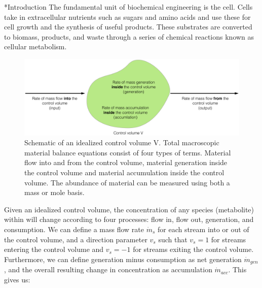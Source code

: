 \documentclass[12pt]{article}
\makeatletter
\renewcommand\section{\@startsection
	{subsection}{2}{0mm}
	{-0.2in}
	{0.05\baselineskip}
	{\normalfont\large\bfseries}}
\makeatother
\begin{document}
\clearpage

\section*{Introduction}
The fundamental unit of biochemical engineering is the cell.
Cells take in extracellular nutrients such as sugars and amino acids and use these for cell growth and the synthesis of useful products.
These substrates are converted to biomass, products, and waste through a series of chemical reactions known as cellular metabolism.



\begin{figure}[h]
\includegraphics[width=1.00\textwidth]{Figure1.png}
\caption{Schematic of an idealized control volume V. Total macroscopic material balance equations consist of four types of terms. Material flow into and from the control volume, material generation inside the control volume and material accumulation inside the control volume. The abundance of material can be measured using both a mass or mole basis.}
\label{fig:Carbon}
\end{figure}


Given an idealized control volume, the concentration of any species (metabolite) within will change according to four processes: flow in, flow out, generation, and consumption.
We can define a mass flow rate $\dot{m}_s$ for each stream into or out of the control volume, and a direction parameter $v_s$ such that $v_s=1$ for streams entering the control volume and $v_s=-1$ for streams exiting the control volume.
Furthermore, we can define generation minus consumption as net generation $\dot{m}_{gen}$, and the overall resulting change in concentration as accumulation $\dot{m}_{acc}$.
This gives us:
\end{document}
